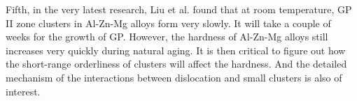 Fifth, in the very latest research, Liu et al. \cite{liu2020formation} found that at room temperature, \ac{GP} II zone clusters in Al-Zn-Mg alloys form very slowly. It will take a couple of weeks for the growth of \ac{GP}. However, the hardness of Al-Zn-Mg alloys still increases very quickly during natural aging. It is then critical to figure out how the short-range orderliness of clusters will affect the hardness. And the detailed mechanism of the interactions between dislocation and small clusters is also of interest.